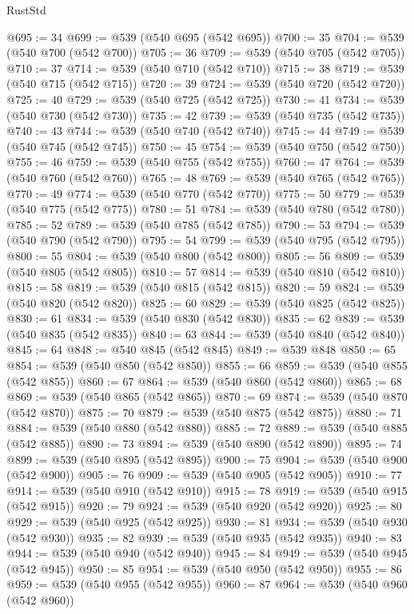 \begin{lexlean}{RustStd}
\begin{coremodule}
{\begin{coremodule}
{{{{{{{{{{{{{{{{{{{{{{{{{{@695 := 34
@699 := @539 (@540 @695 (@542 @695))
@700 := 35
@704 := @539 (@540 @700 (@542 @700))
@705 := 36
@709 := @539 (@540 @705 (@542 @705))
@710 := 37
@714 := @539 (@540 @710 (@542 @710))
@715 := 38
@719 := @539 (@540 @715 (@542 @715))
@720 := 39
@724 := @539 (@540 @720 (@542 @720))
@725 := 40
@729 := @539 (@540 @725 (@542 @725))
@730 := 41
@734 := @539 (@540 @730 (@542 @730))
@735 := 42
@739 := @539 (@540 @735 (@542 @735))
@740 := 43
@744 := @539 (@540 @740 (@542 @740))
@745 := 44
@749 := @539 (@540 @745 (@542 @745))
@750 := 45
@754 := @539 (@540 @750 (@542 @750))
@755 := 46
@759 := @539 (@540 @755 (@542 @755))
@760 := 47
@764 := @539 (@540 @760 (@542 @760))
@765 := 48
@769 := @539 (@540 @765 (@542 @765))
@770 := 49
@774 := @539 (@540 @770 (@542 @770))
@775 := 50
@779 := @539 (@540 @775 (@542 @775))
@780 := 51
@784 := @539 (@540 @780 (@542 @780))
@785 := 52
@789 := @539 (@540 @785 (@542 @785))
@790 := 53
@794 := @539 (@540 @790 (@542 @790))
@795 := 54
@799 := @539 (@540 @795 (@542 @795))
@800 := 55
@804 := @539 (@540 @800 (@542 @800))
@805 := 56
@809 := @539 (@540 @805 (@542 @805))
@810 := 57
@814 := @539 (@540 @810 (@542 @810))
@815 := 58
@819 := @539 (@540 @815 (@542 @815))
@820 := 59
@824 := @539 (@540 @820 (@542 @820))
@825 := 60
@829 := @539 (@540 @825 (@542 @825))
@830 := 61
@834 := @539 (@540 @830 (@542 @830))
@835 := 62
@839 := @539 (@540 @835 (@542 @835))
@840 := 63
@844 := @539 (@540 @840 (@542 @840))
@845 := 64
@848 := @540 @845 (@542 @845)
@849 := @539 @848
@850 := 65
@854 := @539 (@540 @850 (@542 @850))
@855 := 66
@859 := @539 (@540 @855 (@542 @855))
@860 := 67
@864 := @539 (@540 @860 (@542 @860))
@865 := 68
@869 := @539 (@540 @865 (@542 @865))
@870 := 69
@874 := @539 (@540 @870 (@542 @870))
@875 := 70
@879 := @539 (@540 @875 (@542 @875))
@880 := 71
@884 := @539 (@540 @880 (@542 @880))
@885 := 72
@889 := @539 (@540 @885 (@542 @885))
@890 := 73
@894 := @539 (@540 @890 (@542 @890))
@895 := 74
@899 := @539 (@540 @895 (@542 @895))
@900 := 75
@904 := @539 (@540 @900 (@542 @900))
@905 := 76
@909 := @539 (@540 @905 (@542 @905))
@910 := 77
@914 := @539 (@540 @910 (@542 @910))
@915 := 78
@919 := @539 (@540 @915 (@542 @915))
@920 := 79
@924 := @539 (@540 @920 (@542 @920))
@925 := 80
@929 := @539 (@540 @925 (@542 @925))
@930 := 81
@934 := @539 (@540 @930 (@542 @930))
@935 := 82
@939 := @539 (@540 @935 (@542 @935))
@940 := 83
@944 := @539 (@540 @940 (@542 @940))
@945 := 84
@949 := @539 (@540 @945 (@542 @945))
@950 := 85
@954 := @539 (@540 @950 (@542 @950))
@955 := 86
@959 := @539 (@540 @955 (@542 @955))
@960 := 87
@964 := @539 (@540 @960 (@542 @960))
}}}}}}}}}}}}}}}}}}}}}}}}}}
\end{coremodule}}
\end{coremodule}
\end{lexlean}
